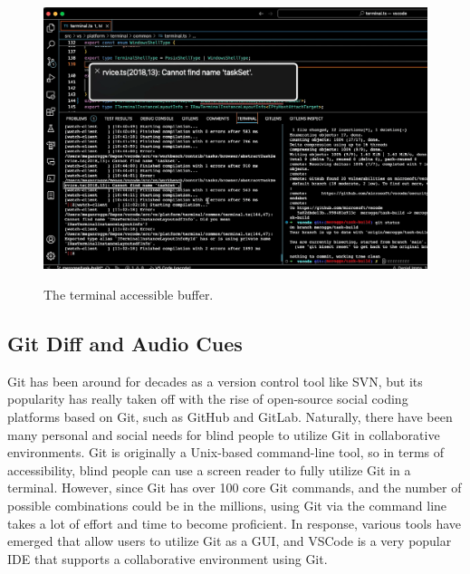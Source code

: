 \documentclass[sigconf]{acmart}
\begin{document}
\begin{figure}
{\centering \includegraphics{images/terminal-accessible-buffer.png}}
\caption{The terminal accessible buffer.}
\end{figure}

\hypertarget{git-diff-and-audio-cues}{%
\subsection{Git Diff and Audio Cues}\label{git-diff-and-audio-cues}}

Git has been around for decades as a version control tool like SVN, but
its popularity has really taken off with the rise of open-source social
coding platforms based on Git, such as GitHub and GitLab. Naturally,
there have been many personal and social needs for blind people to
utilize Git in collaborative environments. Git is originally a
Unix-based command-line tool, so in terms of accessibility, blind people
can use a screen reader to fully utilize Git in a terminal. However,
since Git has over 100 core Git commands, and the number of possible
combinations could be in the millions, using Git via the command line
takes a lot of effort and time to become proficient. In response,
various tools have emerged that allow users to utilize Git as a GUI, and
VSCode is a very popular IDE that supports a collaborative environment
using Git.
\end{document}
